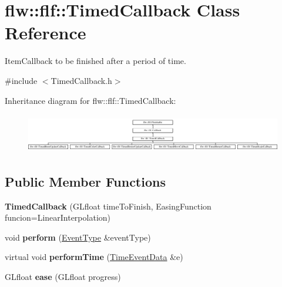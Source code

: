 \hypertarget{classflw_1_1flf_1_1TimedCallback}{}\section{flw\+:\+:flf\+:\+:Timed\+Callback Class Reference}
\label{classflw_1_1flf_1_1TimedCallback}


Item\+Callback to be finished after a period of time.  




{\ttfamily \#include $<$Timed\+Callback.\+h$>$}

Inheritance diagram for flw\+:\+:flf\+:\+:Timed\+Callback\+:\begin{figure}[H]
\begin{center}
\leavevmode
\includegraphics[height=1.736434cm]{classflw_1_1flf_1_1TimedCallback}
\end{center}
\end{figure}
\subsection*{Public Member Functions}
\begin{DoxyCompactItemize}
\item 
{\bfseries Timed\+Callback} (G\+Lfloat time\+To\+Finish, Easing\+Function funcion=Linear\+Interpolation)\hypertarget{classflw_1_1flf_1_1TimedCallback_a0cfebc920db040bba77226e353648028}{}\label{classflw_1_1flf_1_1TimedCallback_a0cfebc920db040bba77226e353648028}

\item 
void {\bfseries perform} (\hyperlink{classflw_1_1flf_1_1EventType}{Event\+Type} \&event\+Type)\hypertarget{classflw_1_1flf_1_1TimedCallback_a5e6b44ba24f586a781fda703328ff51a}{}\label{classflw_1_1flf_1_1TimedCallback_a5e6b44ba24f586a781fda703328ff51a}

\item 
virtual void {\bfseries perform\+Time} (\hyperlink{structflw_1_1flf_1_1TimeEventData}{Time\+Event\+Data} \&e)\hypertarget{classflw_1_1flf_1_1TimedCallback_a041d07418c40a4fa7b58e8bc1eccfe2b}{}\label{classflw_1_1flf_1_1TimedCallback_a041d07418c40a4fa7b58e8bc1eccfe2b}

\item 
G\+Lfloat {\bfseries ease} (G\+Lfloat progress)\hypertarget{classflw_1_1flf_1_1TimedCallback_a0a2ab8405e0bda814eb40052c92b7d2e}{}\label{classflw_1_1flf_1_1TimedCallback_a0a2ab8405e0bda814eb40052c92b7d2e}

\end{DoxyCompactItemize}

